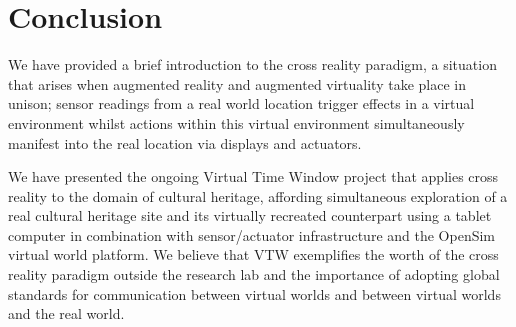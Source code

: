 \documentclass[conference,a4paper]{IEEEtran}
\begin{document}
\section{Conclusion}
We have provided a brief introduction to the cross reality paradigm, a situation that arises when augmented reality and augmented virtuality take place in unison; sensor readings from a real world location trigger effects in a virtual environment whilst actions within this virtual environment simultaneously manifest into the real location via displays and actuators.

We have presented the ongoing Virtual Time Window project that applies cross reality to the domain of cultural heritage, affording simultaneous exploration of a real cultural heritage site and its virtually recreated counterpart using a tablet computer in combination with sensor/actuator infrastructure and the OpenSim virtual world platform. We believe that VTW exemplifies the worth of the cross reality paradigm outside the research lab and the importance of adopting global standards for communication between virtual worlds and between virtual worlds and the real world.





%






\end{document}
